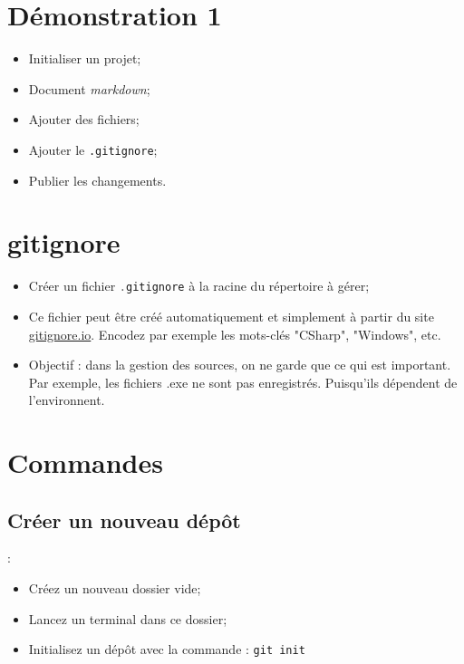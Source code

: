 \documentclass[10pt]{beamer}
\begin{document}
\section{Démonstration 1}
\begin{frame}{\secname}
    \begin{itemize}
        \item Initialiser un projet;
        \item Document \emph{markdown};
        \item Ajouter des fichiers;
        \item Ajouter le \lstinline[language=git]!.gitignore!;
        \item Publier les changements.
    \end{itemize}
\end{frame}

\section{gitignore}
\begin{frame}{\secname}
    \begin{itemize}
        \item Créer un fichier \lstinline[language=c]!.gitignore! à la racine du répertoire à gérer;
        \item Ce fichier peut être créé automatiquement et simplement à partir du site \href{https://www.gitignore.io/}{gitignore.io}. Encodez par exemple les mots-clés "CSharp", "Windows", etc.
        \item Objectif : dans la gestion des sources, on ne garde que ce qui est important. Par exemple, les fichiers .exe ne sont pas enregistrés. Puisqu’ils dépendent de l’environnent.
    \end{itemize}
\end{frame}

\section{Commandes}
\subsection{Créer un nouveau dépôt}
\begin{frame}{\secname : \subsecname}
    \begin{itemize}
        \item Créez un nouveau dossier vide;
        \item Lancez un terminal dans ce dossier;
        \item Initialisez un dépôt avec la commande :
              \lstinline[language=git]!git init!
    \end{itemize}
\end{frame}
\end{document}
